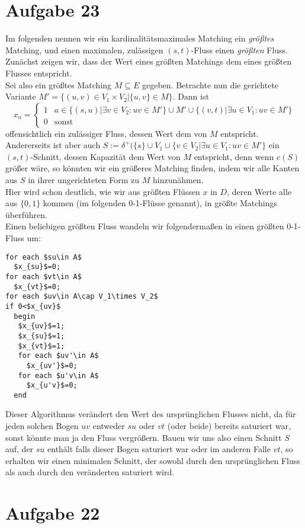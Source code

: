 \documentclass[a4paper,12pt,german]{scrartcl}
\begin{document}
\section*{Aufgabe 23}
Im folgenden nennen wir ein kardinalitätsmaximales Matching ein \emph{größtes} Matching, und einen maximalen, zulässigen $(s,t)$-Fluss einen \emph{größten} Fluss.\\
Zunächst zeigen wir, dass der Wert eines größten Matchings dem eines größten Flusses entspricht.\\
Sei also ein größtes Matching $M\subseteq E$ gegeben. Betrachte nun die gerichtete Variante $M'=\{(u,v)\in V_1\times V_2|\{u,v\}\in M\}$. Dann ist 
$$x_a=\begin{cases}1 &a\in \{(s,u)|\exists v\in V_2:uv\in M'\}\cup M'\cup \{(v,t)|\exists u\in V_1:uv\in M'\}\\
0&\text{sonst}\end{cases}$$
offensichtlich ein zulässiger Fluss, dessen Wert dem von $M$ entspricht.\\
Andererseits ist aber auch $S:=\delta^+(\{s\}\cup V_1\cup \{v\in V_2|\exists u\in V_1:uv\in M'\}$ ein $(s,t)$-Schnitt, dessen Kapazität dem Wert von $M$ entspricht, denn wenn $c(S)$ größer wäre, so könnten wir ein größeres Matching finden, indem wir alle Kanten aus $S$ in ihrer ungerichteten Form zu $M$ hinzunähmen.\\
Hier wird schon deutlich, wie wir aus größten Flüssen $x$ in $D$, deren Werte alle aus $\{0,1\}$ kommen (im folgenden 0-1-Flüsse genannt), in größte Matchings überführen.\\
Einen beliebigen größten Fluss wandeln wir folgendermaßen in einen größten 0-1-Fluss um:\\
\begin{lstlisting}[mathescape]
for each $su\in A$
  $x_{su}$=0;
for each $vt\in A$
  $x_{vt}$=0;
for each $uv\in A\cap V_1\times V_2$
if 0<$x_{uv}$
  begin
   $x_{uv}$=1;
   $x_{su}$=1;
   $x_{vt}$=1;
   for each $uv'\in A$
     $x_{uv'}$=0;
   for each $u'v\in A$
     $x_{u'v}$=0;  
  end
\end{lstlisting}
Dieser Algorithmus verändert den Wert des ursprünglichen Flusses nicht, da für jeden solchen Bogen $uv$ entweder $su$ oder $vt$ (oder beide) bereits saturiert war, sonst könnte man ja den Fluss vergrößern. Bauen wir uns also einen Schnitt $S$ auf, der $su$ enthält falls dieser Bogen saturiert war oder im anderen Falle $vt$, so erhalten wir einen minimalen Schnitt, der sowohl durch den ursprünglichen Fluss als auch durch den veränderten saturiert wird.
\section*{Aufgabe 22}
\end{document}
